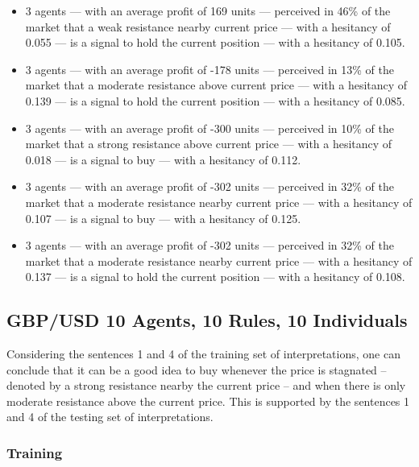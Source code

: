{\small
  \begin{itemize}
  \item 3 agents — with an average profit of 169 units — perceived in 46\% of
    the market that a weak resistance nearby current price — with a hesitancy of
    0.055 — is a signal to hold the current position — with a hesitancy of
    0.105.
  \item 3 agents — with an average profit of -178 units — perceived in 13\% of
    the market that a moderate resistance above current price — with a hesitancy
    of 0.139 — is a signal to hold the current position — with a hesitancy of
    0.085.
  \item 3 agents — with an average profit of -300 units — perceived in 10\% of
    the market that a strong resistance above current price — with a hesitancy
    of 0.018 — is a signal to buy — with a hesitancy of 0.112.
  \item 3 agents — with an average profit of -302 units — perceived in 32\% of
    the market that a moderate resistance nearby current price — with a
    hesitancy of 0.107 — is a signal to buy — with a hesitancy of 0.125.
  \item 3 agents — with an average profit of -302 units — perceived in 32\% of
    the market that a moderate resistance nearby current price — with a
    hesitancy of 0.137 — is a signal to hold the current position — with a
    hesitancy of 0.108.
  \end{itemize}
}

\subsection{GBP/USD 10 Agents, 10 Rules, 10 Individuals}
\label{results:interpretation-gbp-usd-10agents-10rules-10individuals}

Considering the sentences 1 and 4 of the training set of interpretations, one
can conclude that it can be a good idea to buy whenever the price is stagnated
-- denoted by a strong resistance nearby the current price -- and when there is
only moderate resistance above the current price. This is supported by the
sentences 1 and 4 of the testing set of interpretations.

\subsubsection{Training}

